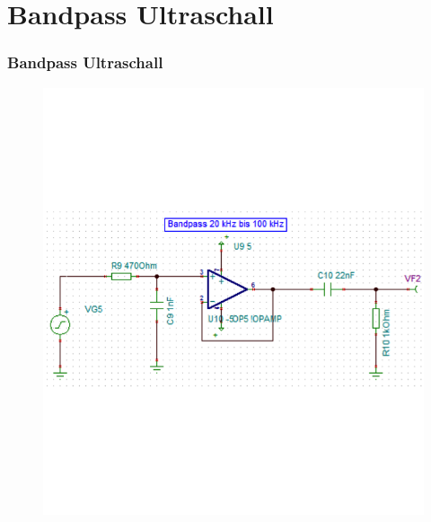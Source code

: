 \section{Bandpass Ultraschall}
\begin{frame}
    \frametitle{Bandpass Ultraschall}
    \begin{figure}
        \begin{minipage}{0.45\textwidth}
            \includegraphics[width=\textwidth]{fig/Bandpass_20kHz-100kHz_Schema.png}
        \end{minipage}
        \begin{minipage}{0.45\textwidth}

\end{minipage}
\end{figure}
\end{frame}
